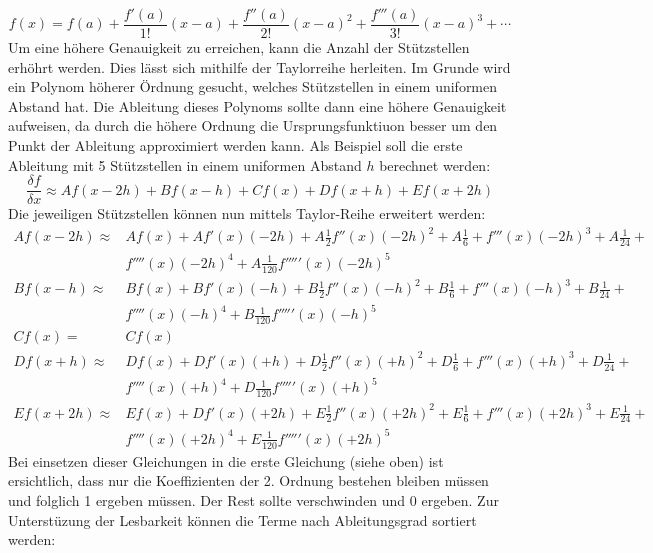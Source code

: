 \begin{equation}
f(x) = f(a)+{\frac {f'(a)}{1!}}(x-a)+{\frac {f''(a)}{2!}}(x-a)^{2}+{\frac {f'''(a)}{3!}}(x-a)^{3}+\cdots
\label{ableitung:eqn:taylorseries}
\end{equation}
Um eine höhere Genauigkeit zu erreichen, kann die Anzahl der Stützstellen erhöhrt werden. 
Dies lässt sich mithilfe der Taylorreihe herleiten.
Im Grunde wird ein Polynom höherer Ördnung gesucht, welches Stützstellen in einem uniformen Abstand hat.
Die Ableitung dieses Polynoms sollte dann eine höhere Genauigkeit aufweisen, da durch die höhere Ordnung die Ursprungsfunktiuon besser um den Punkt der Ableitung approximiert werden kann.
Als Beispiel soll die erste Ableitung mit 5 Stützstellen in einem uniformen Abstand $h$ berechnet werden:
\begin{equation}
\frac{\delta f}{\delta x} \approx Af(x-2h) + Bf(x-h) + Cf(x) + Df(x+h) + Ef(x+2h)
\end{equation}
Die jeweiligen Stützstellen können nun mittels Taylor-Reihe erweitert werden:
\begin{equation}
\begin{split}
Af(x-2h) \approx & Af(x) + Af'(x)(-2h) + A\frac{1}{2}f''(x)(-2h)^2+A\frac{1}{6} + f'''(x)(-2h)^3+A\frac{1}{24} + \\ 
& f''''(x)(-2h)^4 + A\frac{1}{120}f'''''(x)(-2h)^5 \\
Bf(x-h) \approx & Bf(x) + Bf'(x)(-h) + B\frac{1}{2}f''(x)(-h)^2+B\frac{1}{6} + f'''(x)(-h)^3+B\frac{1}{24} + \\ 
& f''''(x)(-h)^4 + B\frac{1}{120}f'''''(x)(-h)^5 \\
Cf(x) = & Cf(x) \\
Df(x+h) \approx & Df(x) + Df'(x)(+h) + D\frac{1}{2}f''(x)(+h)^2+D\frac{1}{6} + f'''(x)(+h)^3+D\frac{1}{24} + \\ 
& f''''(x)(+h)^4 + D\frac{1}{120}f'''''(x)(+h)^5 \\
Ef(x+2h) \approx & Ef(x) + Df'(x)(+2h) + E\frac{1}{2}f''(x)(+2h)^2+E\frac{1}{6} + f'''(x)(+2h)^3+E\frac{1}{24} + \\ 
& f''''(x)(+2h)^4 + E\frac{1}{120}f'''''(x)(+2h)^5
\end{split}
\end{equation}
Bei einsetzen dieser Gleichungen in die erste Gleichung (siehe oben) ist ersichtlich, dass nur die Koeffizienten der 2. Ordnung bestehen bleiben müssen und folglich 1 ergeben müssen. Der Rest sollte verschwinden und 0 ergeben. Zur Unterstüzung der Lesbarkeit können die Terme nach Ableitungsgrad sortiert werden:
